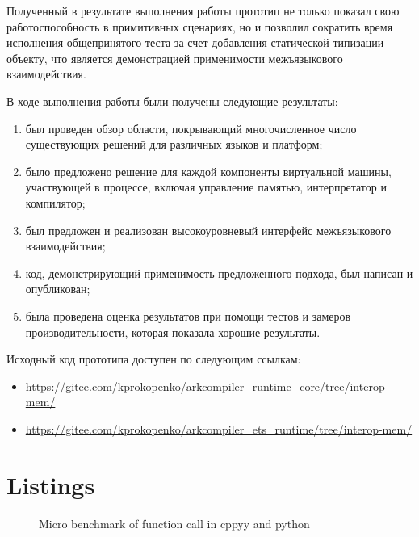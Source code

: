 \documentclass[times,specification,annotation]{itmo-student-thesis}
\begin{document}
\chapterconclusion
Полученный в результате выполнения работы прототип не только показал свою работоспособность в примитивных сценариях, но и позволил сократить время исполнения общепринятого теста за счет добавления статической типизации объекту, что является демонстрацией применимости межъязыкового взаимодействия.

\startconclusionpage
В ходе выполнения работы были получены следующие результаты:
\begin{enumerate}
	\item был проведен обзор области, покрывающий многочисленное число существующих решений для различных языков и платформ;
	\item было предложено решение для каждой компоненты виртуальной машины, участвующей в процессе, включая управление памятью, интерпретатор и компилятор;
	\item был предложен и реализован высокоуровневый интерфейс межъязыкового взаимодействия;
	\item код, демонстрирующий применимость предложенного подхода, был написан и опубликован;
	\item была проведена оценка результатов при помощи тестов и замеров производительности, которая показала хорошие результаты.
\end{enumerate}
Исходный код прототипа доступен по следующим ссылкам:
\begin{itemize}
	\item \url{https://gitee.com/kprokopenko/arkcompiler_runtime_core/tree/interop-mem/}
	\item \url{https://gitee.com/kprokopenko/arkcompiler_ets_runtime/tree/interop-mem/}
\end{itemize}

\printmainbibliography
\appendix

\chapter{Listings}
\begin{figure}[!h]
	\caption{Micro benchmark of function call in cppyy and python}\label{apx:cppyy-bench}
	
\end{figure}
\end{document}
